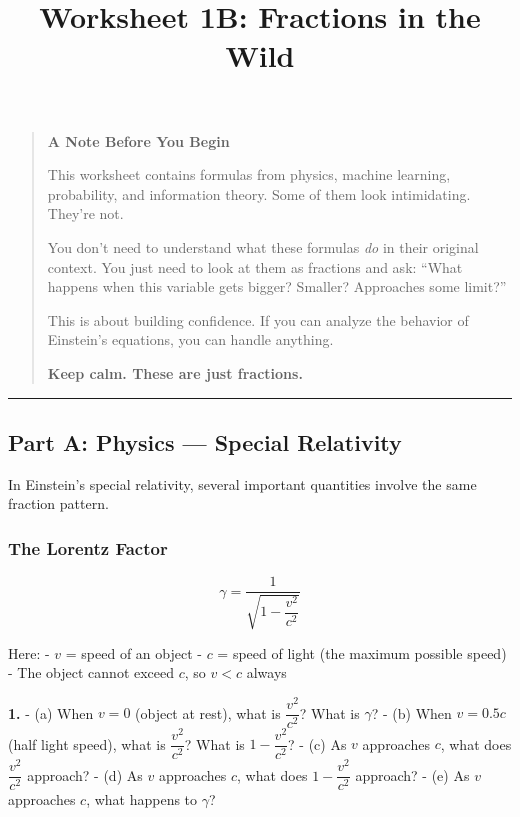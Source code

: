 \documentclass[
  11pt,
]{article}
\title{Worksheet 1B: Fractions in the Wild}
\author{}
\date{}
\begin{document}
\maketitle

\begin{quote}
\textbf{A Note Before You Begin}

This worksheet contains formulas from physics, machine learning,
probability, and information theory. Some of them look intimidating.
They're not.

You don't need to understand what these formulas \emph{do} in their
original context. You just need to look at them as fractions and ask:
``What happens when this variable gets bigger? Smaller? Approaches some
limit?''

This is about building confidence. If you can analyze the behavior of
Einstein's equations, you can handle anything.

\textbf{Keep calm. These are just fractions.}
\end{quote}

\begin{center}\rule{0.5\linewidth}{0.5pt}\end{center}

\hypertarget{part-a-physics-special-relativity}{%
\subsection{Part A: Physics --- Special
Relativity}\label{part-a-physics-special-relativity}}

In Einstein's special relativity, several important quantities involve
the same fraction pattern.

\hypertarget{the-lorentz-factor}{%
\subsubsection{The Lorentz Factor}\label{the-lorentz-factor}}

\[\gamma = \dfrac{1}{\sqrt{1 - \dfrac{v^2}{c^2}}}\]

Here: - \(v\) = speed of an object - \(c\) = speed of light (the maximum
possible speed) - The object cannot exceed \(c\), so \(v < c\) always

\textbf{1.} - (a) When \(v = 0\) (object at rest), what is
\(\dfrac{v^2}{c^2}\)? What is \(\gamma\)? - (b) When \(v = 0.5c\) (half
light speed), what is \(\dfrac{v^2}{c^2}\)? What is
\(1 - \dfrac{v^2}{c^2}\)? - (c) As \(v\) approaches \(c\), what does
\(\dfrac{v^2}{c^2}\) approach? - (d) As \(v\) approaches \(c\), what
does \(1 - \dfrac{v^2}{c^2}\) approach? - (e) As \(v\) approaches \(c\),
what happens to \(\gamma\)?
\end{document}

